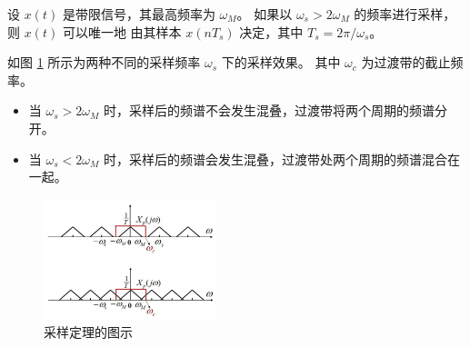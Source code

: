 \begin{theorem}
    设 $x(t)$ 是带限信号，其最高频率为 $\omega_M$。
    如果以 $\omega_s > 2\omega_M$ 的频率进行采样，则 $x(t)$ 可以唯一地
    由其样本 $x(nT_s)$ 决定，其中 $T_s = 2\pi/\omega_s$。
\end{theorem}

\begin{example}[采样定理的图示]
    如图 \ref{fig:sampling-theorem} 所示为两种不同的采样频率 $\omega_s$ 下的采样效果。
    其中 $\omega_c$ 为过渡带的截止频率。
    \begin{itemize}
        \item 当 $\omega_s > 2\omega_M$ 时，采样后的频谱不会发生混叠，过渡带将两个周期的频谱分开。
        \item 当 $\omega_s < 2\omega_M$ 时，采样后的频谱会发生混叠，过渡带处两个周期的频谱混合在一起。
    \end{itemize}
    \begin{figure}[H]
        \centering
        \includegraphics[width=0.45\textwidth]{chap2/img/sampling-theorem.png}
        \caption{采样定理的图示}
        \label{fig:sampling-theorem}
    \end{figure}
\end{example}

